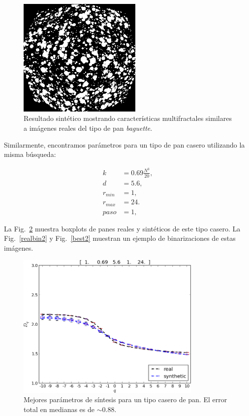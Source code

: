 \begin{figure}[!ht]
\begin{center}
\includegraphics[width=6cm]{figures/best}
\caption{Resultado sintético mostrando características multifractales similares a imágenes reales del tipo de pan {\em baguette}.}
\label{best}
\end{center}
\end{figure}

Similarmente, encontramos parámetros para un tipo de pan casero utilizando la misma búsqueda:

\begin{align*}
k &= 0.69 \frac{N^{3}}{20} ,\\
d &=5.6,\\
r_{min} &=1,\\
r_{max} &=24.\\
paso &=1,
\end{align*}

La Fig.~\ref{bestboxplot2} muestra boxplots de panes reales y sintéticos de este tipo casero.
La Fig.~\ref{realbin2} y  Fig.~\ref{best2} muestran un ejemplo de binarizaciones de estas imágenes. 


\begin{figure}[!ht]
\includegraphics[width=9cm]{figures/bestboxplot2}
\caption[Mejores parámetros de síntesis para un tipo casero de pan]{Mejores parámetros de síntesis para un tipo casero de pan. El error total en medianas es de $\sim 0.88$.}
\label{bestboxplot2}
\end{figure}

